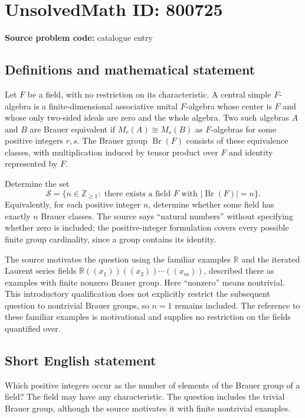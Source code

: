 \documentclass[11pt]{article}
\newcommand{\Z}{\mathbb{Z}}
\newcommand{\R}{\mathbb{R}}
\begin{document}
\section*{UnsolvedMath ID: 800725}
\textbf{Source problem code:} catalogue entry
\subsection{Definitions and mathematical statement}
Let \(F\) be a field, with no restriction on its characteristic. A central simple \(F\)-algebra is a finite-dimensional associative unital \(F\)-algebra whose center is \(F\) and whose only two-sided ideals are zero and the whole algebra. Two such algebras \(A\) and \(B\) are Brauer equivalent if \(M_r(A)\cong M_s(B)\) as \(F\)-algebras for some positive integers \(r,s\). The Brauer group \(\operatorname{Br}(F)\) consists of these equivalence classes, with multiplication induced by tensor product over \(F\) and identity represented by \(F\).

Determine the set
\[
\mathcal S=\bigl\{n\in\Z_{\geq 1}:\text{ there exists a field }F\text{ with }\lvert\operatorname{Br}(F)\rvert=n\bigr\}.
\]
Equivalently, for each positive integer \(n\), determine whether some field has exactly \(n\) Brauer classes. The source says ``natural numbers'' without specifying whether zero is included; the positive-integer formulation covers every possible finite group cardinality, since a group contains its identity.

The source motivates the question using the familiar examples \(\R\) and the iterated Laurent series fields \(\R((x_1))((x_2))\cdots((x_m))\), described there as examples with finite nonzero Brauer group. Here ``nonzero'' means nontrivial. This introductory qualification does not explicitly restrict the subsequent question to nontrivial Brauer groups, so \(n=1\) remains included. The reference to these familiar examples is motivational and supplies no restriction on the fields quantified over.
\subsection{Short English statement}
Which positive integers occur as the number of elements of the Brauer group of a field? The field may have any characteristic. The question includes the trivial Brauer group, although the source motivates it with finite nontrivial examples.
\end{document}
